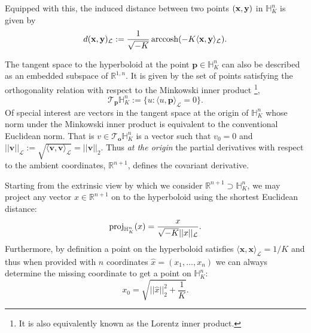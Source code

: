 Equipped with this, the induced distance between two points $(\mathbf{x},\mathbf{y})$ in $\mathbb{H}^{n}_K$ is given by
\begin{equation}
    d(\textbf{x},\textbf{y})_{\mathcal{L}} := \frac{1}{\sqrt{-K}}\operatorname{arccosh}(-K \langle \textbf{x}, \textbf{y} \rangle_{\mathcal{L}}).
\end{equation}

The tangent space to the hyperboloid at the point $\textbf{p} \in \mathbb{H}_K^n$ can also be described as an embedded subspace of $\mathbb{R}^{1,n}$.  
It is given by the set of points satisfying the orthogonality relation with respect to the Minkowski inner product \footnote{It is also equivalently known as the Lorentz inner product.},
\begin{equation}
    \mathcal{T}_{\textbf{p}}\mathbb{H}^n_K := \{u: \langle u, \textbf{p} \rangle_{\mathcal{L}} = 0 \}.
\end{equation}
Of special interest are vectors in the tangent space at the origin of $\mathbb{H}^{n}_K$ whose norm under the Minkowski inner product is equivalent to the conventional Euclidean norm. That is $v \in \mathcal{T}_{\textbf{o}}\mathbb{H}^{n}_K$ is a vector such that $v_0 = 0$ and $||\textbf{v}||_{\mathcal{L}} := \sqrt{\langle \textbf{v}, \textbf{v}
\rangle_{\mathcal{L}}} = ||\textbf{v}||_2$.  Thus \emph{at the origin} the
partial derivatives with respect to the ambient coordinates, $\mathbb{R}^{n+1}$, defines the
covariant derivative.  

Starting from the extrinsic view by which we consider $\mathbb{R}^{n+1} \supset \mathbb{H}^{n}_K$, we may project any vector $x \in \mathbb{R}^{n+1}$ on to the hyperboloid using the shortest Euclidean distance:
\begin{equation}
    \textnormal{proj}_{\mathbb{H}^{n}_K}(x) = \frac{x}{\sqrt{-K}||x||_{\mathcal{L}}}.
\end{equation}
Furthermore, by definition a point on the hyperboloid satisfies $\langle \textbf{x}, \textbf{x} \rangle_{\mathcal{L}} = 1/K$ and thus when provided with $n$ coordinates $\hat{x} = (x_1, \dots, x_{n})$ we can always determine the missing coordinate to get a point on $\mathbb{H}^n_K$:
\begin{equation}
    \label{eqn:hyperboloid_projection}
    x_0 = \sqrt{||\hat{x}||^2_2 + \frac{1}{K}}.
\end{equation}

